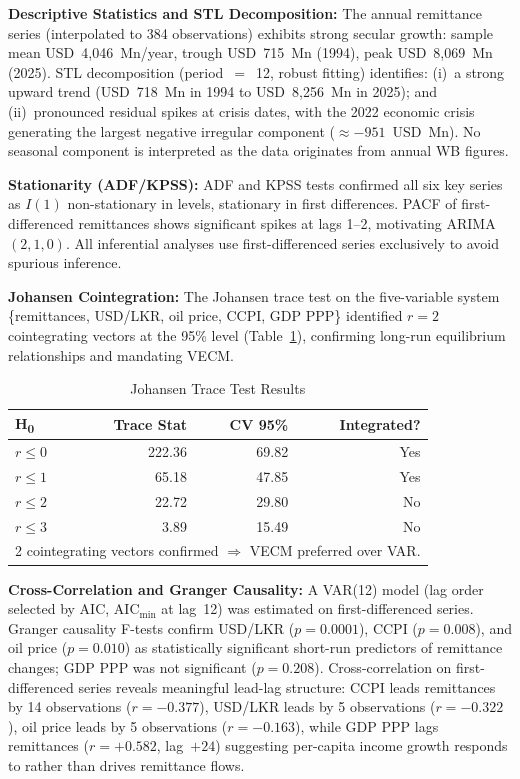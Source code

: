 \documentclass[sigconf]{acmart}
\begin{document}
\noindent\textbf{Descriptive Statistics and STL Decomposition:}
The annual remittance series (interpolated to 384 observations) exhibits strong secular growth: sample mean USD~4,046~Mn/year, trough USD~715~Mn (1994), peak USD~8,069~Mn (2025). STL decomposition (period~$=$~12, robust fitting) identifies: (i)~a strong upward trend (USD~718~Mn in 1994 to USD~8,256~Mn in 2025); and (ii)~pronounced residual spikes at crisis dates, with the 2022 economic crisis generating the largest negative irregular component ($\approx-951$~USD~Mn). No seasonal component is interpreted as the data originates from annual WB figures.

\noindent\textbf{Stationarity (ADF/KPSS):}
ADF and KPSS tests confirmed all six key series as $I(1)$ non-stationary in levels, stationary in first differences. PACF of first-differenced remittances shows significant spikes at lags 1--2, motivating ARIMA$(2,1,0)$. All inferential analyses use first-differenced series exclusively to avoid spurious inference.

\noindent\textbf{Johansen Cointegration:}
The Johansen trace test on the five-variable system \{remittances, USD/LKR, oil price, CCPI, GDP PPP\} identified $r=2$ cointegrating vectors at the 95\% level (Table~\ref{tab:johansen}), confirming long-run equilibrium relationships and mandating VECM.

\begin{table}[h]
\centering
\caption{Johansen Trace Test Results}
\label{tab:johansen}
\small
\begin{tabular}{lrrr}
\toprule
\textbf{H\textsubscript{0}} & \textbf{Trace Stat} & \textbf{CV 95\%} & \textbf{Integrated?} \\
\midrule
$r \leq 0$ & 222.36 & 69.82 & Yes \\
$r \leq 1$ & 65.18  & 47.85 & Yes \\
$r \leq 2$ & 22.72  & 29.80 & No  \\
$r \leq 3$ & 3.89   & 15.49 & No  \\
\bottomrule
\multicolumn{4}{l}{\small 2 cointegrating vectors confirmed $\Rightarrow$ VECM preferred over VAR.}
\end{tabular}
\end{table}

\noindent\textbf{Cross-Correlation and Granger Causality:}
A VAR(12) model (lag order selected by AIC, AIC$_{\min}$ at lag~12) was estimated on first-differenced series. Granger causality F-tests confirm USD/LKR ($p=0.0001$), CCPI ($p=0.008$), and oil price ($p=0.010$) as statistically significant short-run predictors of remittance changes; GDP PPP was not significant ($p=0.208$). Cross-correlation on first-differenced series reveals meaningful lead-lag structure: CCPI leads remittances by 14 observations ($r=-0.377$), USD/LKR leads by 5 observations ($r=-0.322$), oil price leads by 5 observations ($r=-0.163$), while GDP PPP lags remittances ($r=+0.582$, lag~$+24$) suggesting per-capita income growth responds to rather than drives remittance flows.
\end{document}

